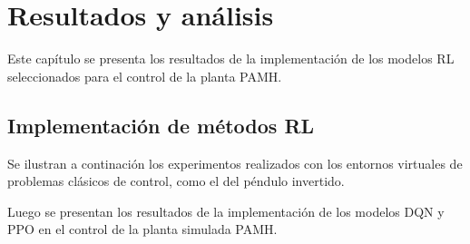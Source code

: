 \chapter{Resultados y análisis}
\label{ch:resultados}

Este capítulo se presenta los resultados de la implementación de los modelos RL seleccionados para el control de la planta PAMH.

\section{Implementación de métodos RL}

Se ilustran a continación los experimentos realizados con los entornos virtuales de problemas clásicos de control, como el del péndulo invertido.

Luego se presentan los resultados de la implementación de los modelos DQN y PPO en el control de la planta simulada PAMH.

